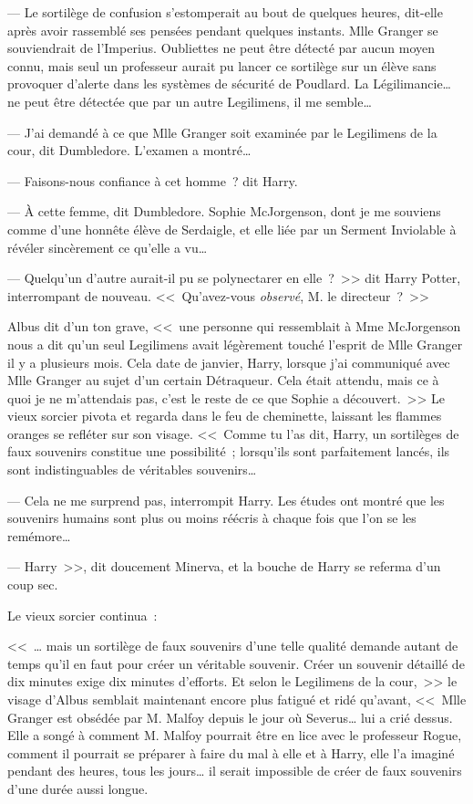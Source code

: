 --- Le sortilège de confusion s'estomperait au bout de quelques heures, dit-elle après avoir rassemblé ses pensées pendant quelques instants. Mlle Granger se souviendrait de l'Imperius. Oubliettes ne peut être détecté par aucun moyen connu, mais seul un professeur aurait pu lancer ce sortilège sur un élève sans provoquer d'alerte dans les systèmes de sécurité de Poudlard. La Légilimancie… ne peut être détectée que par un autre Legilimens, il me semble…

--- J'ai demandé à ce que Mlle Granger soit examinée par le Legilimens de la cour, dit Dumbledore. L'examen a montré…

--- Faisons-nous confiance à cet homme~? dit Harry.

--- À cette femme, dit Dumbledore. Sophie McJorgenson, dont je me souviens comme d'une honnête élève de Serdaigle, et elle liée par un Serment Inviolable à révéler sincèrement ce qu'elle a vu…

--- Quelqu'un d'autre aurait-il pu se polynectarer en elle~?~>> dit Harry Potter, interrompant de nouveau. <<~Qu'avez-vous \emph{observé}, M. le directeur~?~>>

Albus dit d'un ton grave, <<~une personne qui ressemblait à Mme McJorgenson nous a dit qu'un seul Legilimens avait légèrement touché l'esprit de Mlle Granger il y a plusieurs mois. Cela date de janvier, Harry, lorsque j'ai communiqué avec Mlle Granger au sujet d'un certain Détraqueur. Cela était attendu, mais ce à quoi je ne m'attendais pas, c'est le reste de ce que Sophie a découvert.~>> Le vieux sorcier pivota et regarda dans le feu de cheminette, laissant les flammes oranges se refléter sur son visage. <<~Comme tu l'as dit, Harry, un sortilèges de faux souvenirs constitue une possibilité~; lorsqu'ils sont parfaitement lancés, ils sont indistinguables de véritables souvenirs…

--- Cela ne me surprend pas, interrompit Harry. Les études ont montré que les souvenirs humains sont plus ou moins réécris à chaque fois que l'on se les remémore…

--- Harry~>>, dit doucement Minerva, et la bouche de Harry se referma d'un coup sec.

Le vieux sorcier continua~:

<<~… mais un sortilège de faux souvenirs d'une telle qualité demande autant de temps qu'il en faut pour créer un véritable souvenir. Créer un souvenir détaillé de dix minutes exige dix minutes d'efforts. Et selon le Legilimens de la cour,~>> le visage d'Albus semblait maintenant encore plus fatigué et ridé qu'avant, <<~Mlle Granger est obsédée par M. Malfoy depuis le jour où Severus… lui a crié dessus. Elle a songé à comment M. Malfoy pourrait être en lice avec le professeur Rogue, comment il pourrait se préparer à faire du mal à elle et à Harry, elle l'a imaginé pendant des heures, tous les jours… il serait impossible de créer de faux souvenirs d'une durée aussi longue.

